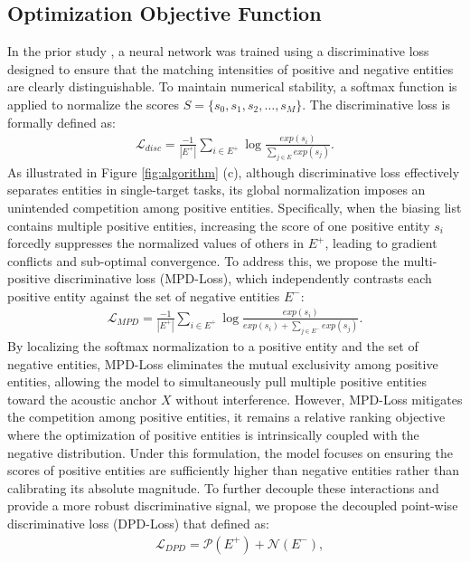 \documentclass[cameraready]{Interspeech}
\begin{document}
\subsection{Optimization Objective Function}
In the prior study \cite{huang2025neuralmodelcontextualbiasing}, a neural network was trained using a discriminative loss designed to ensure that the matching intensities of positive and negative entities are clearly distinguishable.
%
To maintain numerical stability, a softmax function is applied to normalize the scores $S=\{s_0, s_1, s_2, \dots, s_M\}$.
%
The discriminative loss is formally defined as:
%
\begin{align}
  \mathcal{L}_{disc}=\frac{-1}{|E^+|}\sum_{i \in E^+}\log{
    \frac{exp(s_i)}{\sum_{j \in E}exp(s_j)}
  }.
\end{align}
%
As illustrated in Figure \ref{fig:algorithm} (c), although discriminative loss effectively separates entities in single-target tasks, its global normalization imposes an unintended competition among positive entities.
%
Specifically, when the biasing list contains multiple positive entities, increasing the score of one positive entity $s_i$ forcedly suppresses the normalized values of others in $E^+$, leading to gradient conflicts and sub-optimal convergence.
%
To address this, we propose the multi-positive discriminative loss (MPD-Loss), which independently contrasts each positive entity against the set of negative entities $E^-$:
%
\begin{align}
  \mathcal{L}_{MPD}=\frac{-1}{|E^+|}\sum_{i \in E^+}\log{
    \frac{exp(s_i)}{exp(s_i) + \sum_{j \in E^-}exp(s_j)}
  }.
\end{align}
%
By localizing the softmax normalization to a positive entity and the set of negative entities, MPD-Loss eliminates the mutual exclusivity among positive entities, allowing the model to simultaneously pull multiple positive entities toward the acoustic anchor $X$ without interference.
%
However, MPD-Loss mitigates the competition among positive entities, it remains a relative ranking objective where the optimization of positive entities is intrinsically coupled with the negative distribution.
%
Under this formulation, the model focuses on ensuring the scores of positive entities are sufficiently higher than negative entities rather than calibrating its absolute magnitude.
%
To further decouple these interactions and provide a more robust discriminative signal, we propose the decoupled point-wise discriminative loss (DPD-Loss) that defined as:
%
\begin{align}
  &\mathcal{L}_{DPD}=\mathcal{P}(E^+)+\mathcal{N}(E^-),
\end{align}
\end{document}
